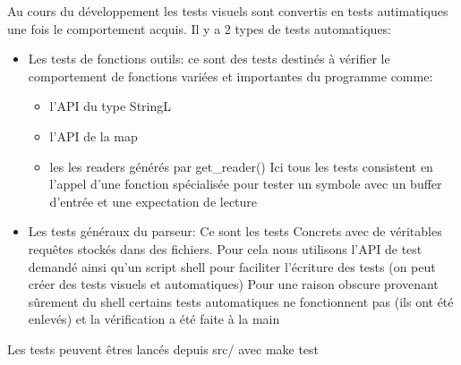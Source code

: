 \documentclass{article}
\begin{document}
            Au cours du développement les tests visuels sont convertis en tests autimatiques une fois le comportement acquis.
            Il y a 2 types de tests automatiques:
            \begin{itemize}
                \item Les tests de fonctions outils: ce sont des tests destinés à vérifier le comportement de fonctions variées et importantes du programme comme:
                \begin{itemize}
                    \item l'API du type StringL
                    \item l'API de la map
                    \item les les readers générés par get\_reader() Ici tous les tests consistent en l'appel d'une fonction spécialisée pour tester un symbole avec un buffer d'entrée et une expectation de lecture
                \end{itemize}
                \item Les tests généraux du parseur: Ce sont les tests Concrets avec de véritables requêtes stockés dans des fichiers. Pour cela nous utilisons l'API de test demandé ainsi qu'un script shell pour faciliter l'écriture des tests (on peut créer des tests visuels et automatiques) Pour une raison obscure provenant sûrement du shell certains tests automatiques ne fonctionnent pas (ils ont été enlevés) et la vérification a été faite à la main
            \end{itemize}
            
            Les tests peuvent êtres lancés depuis src/ avec make test
            
            
\end{document}
